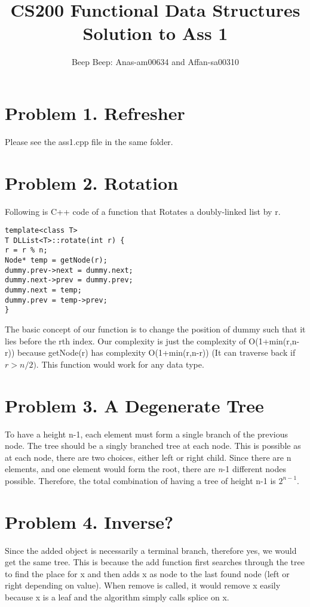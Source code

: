 \documentclass{article}
\title{CS200 Functional Data Structures\\Solution to Ass 1}
\author{Beep Beep: Anas-am00634 and Affan-sa00310}
\begin{document}
\maketitle
\section*{Problem 1. Refresher}
Please see the ass1.cpp file in the same folder.
\section*{Problem 2. Rotation}

Following is C++ code of a function that Rotates a doubly-linked list by r.
\begin{Verbatim}[frame=single]
template<class T>
T DLList<T>::rotate(int r) {
r = r % n;
Node* temp = getNode(r);
dummy.prev->next = dummy.next;
dummy.next->prev = dummy.prev;
dummy.next = temp;
dummy.prev = temp->prev;
}
\end{Verbatim}

The basic concept of our function is to change the position of dummy such that it lies before the rth index.
Our complexity is just the complexity of O(1+min(r,n-r)) because getNode(r) has complexity O(1+min(r,n-r)) (It can traverse back if $r>n/2)$. This function would work for any data type.
 

\section*{Problem 3. A Degenerate Tree}
To have a height n-1, each element must form a single branch of the previous node. The tree should be a singly branched tree at each node. This is possible as at each node, there are two choices, either left or right child. Since there are n elements, and one element would form the root, there are \textit{n}-1 different nodes possible. Therefore, the total combination of having a tree of height n-1 is $2^{n-1}$.


\section*{Problem 4. Inverse?}
Since the added object is necessarily a terminal branch, therefore yes, we would get the same tree. This is because the add function first searches through the tree to find the place for x and then adds x as node to the last found node (left or right depending on value). When remove is called, it would remove x easily because x is a leaf and the algorithm simply calls splice on x.
\end{document}
